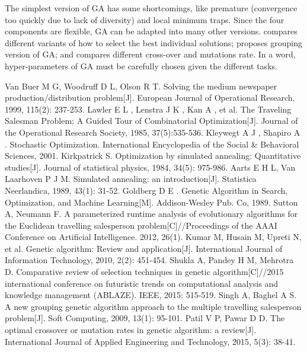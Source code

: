 \documentclass{article}
\begin{document}
	The simplest version of GA has some shortcomings, like premature (convergence too quickly due to lack of diversity) and local minimum traps. Since the four components are flexible, GA can be adapted into many other versions. \cite{ref9} compares different variants of how to select the best individual solutions; \cite{ref10} proposes grouping version of GA; and \cite{ref11} compares different cross-over and mutations rate. In a word, hyper-parameters of GA must be carefully chosen given the different tasks.

\begin{thebibliography}{99}
 Van Buer M G, Woodruff D L, Olson R T. Solving the medium newspaper production/distribution problem[J]. European Journal of Operational Research, 1999, 115(2): 237-253.
 Lawler E L ,  Lenstra J K ,  Kan A , et al. The Traveling Salesman Problem; A Guided Tour of Combinatorial Optimization[J]. Journal of the Operational Research Society, 1985, 37(5):535-536.
 Kleywegt A J , Shapiro A . Stochastic Optimization. International Encyclopedia of the Social \& Behavioral Sciences, 2001.
 Kirkpatrick S. Optimization by simulated annealing: Quantitative studies[J]. Journal of statistical physics, 1984, 34(5): 975-986.
 Aarts E H L, Van Laarhoven P J M. Simulated annealing: an introduction[J]. Statistica Neerlandica, 1989, 43(1): 31-52.
 Goldberg D E . Genetic Algorithm in Search, Optimization, and Machine Learning[M]. Addison-Wesley Pub. Co, 1989.
 Sutton A, Neumann F. A parameterized runtime analysis of evolutionary algorithms for the Euclidean travelling salesperson problem[C]//Proceedings of the AAAI Conference on Artificial Intelligence. 2012, 26(1).
 Kumar M, Husain M, Upreti N, et al. Genetic algorithm: Review and application[J]. International Journal of Information Technology, 2010, 2(2): 451-454.
 Shukla A, Pandey H M, Mehrotra D. Comparative review of selection techniques in genetic algorithm[C]//2015 international conference on futuristic trends on computational analysis and knowledge management (ABLAZE). IEEE, 2015: 515-519.
 Singh A, Baghel A S. A new grouping genetic algorithm approach to the multiple travelling salesperson problem[J]. Soft Computing, 2009, 13(1): 95-101.
 Patil V P, Pawar D D. The optimal crossover or mutation rates in genetic algorithm: a review[J]. International Journal of Applied Engineering and Technology, 2015, 5(3): 38-41.
\end{thebibliography}
\end{document}

